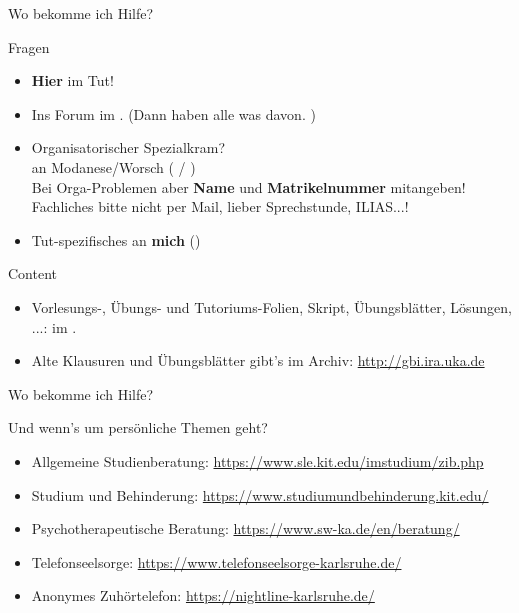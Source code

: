 \begin{frame}{Wo bekomme ich Hilfe?}	
	\begin{block}{Fragen}
		\begin{itemize}
			\item \textbf{Hier} im Tut!
			\item Ins Forum im \ILIAS. (Dann haben alle was davon. \smiley) \\
			\pause
			\item Organisatorischer Spezialkram? \\
				  \impl an Modanese/Worsch ( / ) \\
				  Bei Orga-Problemen aber \textbf{Name} und \textbf{Matrikelnummer}  mitangeben! \\
				  Fachliches bitte nicht per Mail, lieber \impl Sprechstunde, ILIAS...!
			\item Tut-spezifisches an \textbf{mich} (\mailto{\mymail})
		\end{itemize}
	\end{block}
	\pause
	\begin{block}{Content}
		\begin{itemize}
			\item Vorlesungs-, Übungs- und Tutoriums-Folien, Skript, Übungsblätter, Lösungen, ...: im \ILIAS.
			\item Alte Klausuren und Übungsblätter gibt's im Archiv: \url{http://gbi.ira.uka.de}
		\end{itemize}
	\end{block}
\end{frame}

\begin{frame}{Wo bekomme ich Hilfe?}	
	\begin{block}{Und wenn's um persönliche Themen geht?}
		\begin{itemize}
			\item Allgemeine Studienberatung: \url{https://www.sle.kit.edu/imstudium/zib.php}
			\item Studium und Behinderung: \url{https://www.studiumundbehinderung.kit.edu/}
			\item Psychotherapeutische Beratung: \url{https://www.sw-ka.de/en/beratung/}
			\item Telefonseelsorge: \url{https://www.telefonseelsorge-karlsruhe.de/}
			\item Anonymes Zuhörtelefon: \url{https://nightline-karlsruhe.de/}
		\end{itemize}
	\end{block}
\end{frame}

